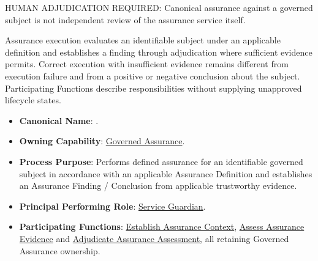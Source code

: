 HUMAN ADJUDICATION REQUIRED: Canonical assurance against a governed subject is not independent review of the assurance service itself.



Assurance execution evaluates an identifiable subject under an applicable definition and establishes a finding through adjudication where sufficient evidence permits. Correct execution with insufficient evidence remains different from execution failure and from a positive or negative conclusion about the subject. Participating Functions describe responsibilities without supplying unapproved lifecycle states.



\begin{itemize}

\item
\textbf{Canonical Name}: \texttt{}.



\item
\textbf{Owning Capability}: \href{https://github.com/fhirfactory/harmonia/blob/98410db60155198a75f74c79d98060070209faa1/docs/markdown/02-strategy/capabilities/business-enabling-capabilities.md\#governed-assurance}{Governed Assurance}.



\item
\textbf{Process Purpose}: Performs defined assurance for an identifiable governed subject in accordance with an applicable Assurance Definition and establishes an Assurance Finding /\allowbreak{} Conclusion from applicable trustworthy evidence.



\item
\textbf{Principal Performing Role}: \href{https://github.com/fhirfactory/harmonia/blob/98410db60155198a75f74c79d98060070209faa1/docs/markdown/03-business-architecture/actors-roles/roles.md\#service-guardian}{Service Guardian}.



\item
\textbf{Participating Functions}: \href{https://github.com/fhirfactory/harmonia/blob/98410db60155198a75f74c79d98060070209faa1/docs/markdown/03-business-architecture/behaviours/health-service-assurance.md\#establish-assurance-context}{Establish Assurance Context}, \href{https://github.com/fhirfactory/harmonia/blob/98410db60155198a75f74c79d98060070209faa1/docs/markdown/03-business-architecture/behaviours/health-service-assurance.md\#assess-assurance-evidence}{Assess Assurance Evidence} and \href{https://github.com/fhirfactory/harmonia/blob/98410db60155198a75f74c79d98060070209faa1/docs/markdown/03-business-architecture/behaviours/health-service-assurance.md\#adjudicate-assurance-assessment}{Adjudicate Assurance Assessment}, all retaining Governed Assurance ownership.




\end{itemize}
